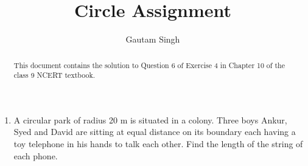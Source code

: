 \documentclass[journal,12pt,twocolumn]{IEEEtran}
\begin{document}
\vspace{3cm}
\title{Circle Assignment}
\author{Gautam Singh}
\maketitle
\bigskip

\begin{abstract}
    This document contains the solution to Question 6 of 
    Exercise 4 in Chapter 10 of the class 9 NCERT textbook.
\end{abstract}

\begin{enumerate}
    \item A circular park of radius 20 m is situated in a colony. Three boys 
    Ankur, Syed and David are sitting at equal distance on its boundary each 
    having a toy telephone in his hands to talk each other. Find the length of 
    the string of each phone.


\end{enumerate}
\end{document}
